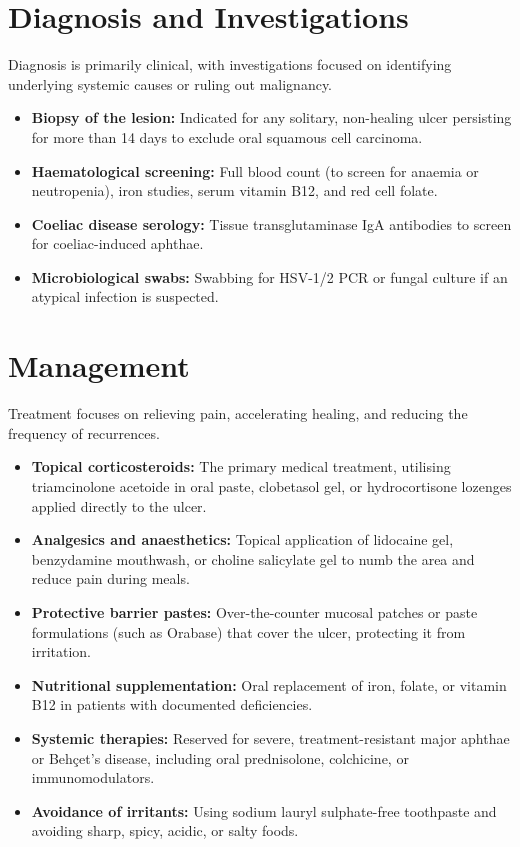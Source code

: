 \section*{Diagnosis and Investigations}
Diagnosis is primarily clinical, with investigations focused on identifying underlying systemic causes or ruling out malignancy.
\begin{itemize}
    \item \textbf{Biopsy of the lesion:} Indicated for any solitary, non-healing ulcer persisting for more than 14 days to exclude oral squamous cell carcinoma.
    \item \textbf{Haematological screening:} Full blood count (to screen for anaemia or neutropenia), iron studies, serum vitamin B12, and red cell folate.
    \item \textbf{Coeliac disease serology:} Tissue transglutaminase IgA antibodies to screen for coeliac-induced aphthae.
    \item \textbf{Microbiological swabs:} Swabbing for HSV-1/2 PCR or fungal culture if an atypical infection is suspected.
\end{itemize}

\section*{Management}
Treatment focuses on relieving pain, accelerating healing, and reducing the frequency of recurrences.
\begin{itemize}
    \item \textbf{Topical corticosteroids:} The primary medical treatment, utilising triamcinolone acetoide in oral paste, clobetasol gel, or hydrocortisone lozenges applied directly to the ulcer.
    \item \textbf{Analgesics and anaesthetics:} Topical application of lidocaine gel, benzydamine mouthwash, or choline salicylate gel to numb the area and reduce pain during meals.
    \item \textbf{Protective barrier pastes:} Over-the-counter mucosal patches or paste formulations (such as Orabase) that cover the ulcer, protecting it from irritation.
    \item \textbf{Nutritional supplementation:} Oral replacement of iron, folate, or vitamin B12 in patients with documented deficiencies.
    \item \textbf{Systemic therapies:} Reserved for severe, treatment-resistant major aphthae or Behçet's disease, including oral prednisolone, colchicine, or immunomodulators.
    \item \textbf{Avoidance of irritants:} Using sodium lauryl sulphate-free toothpaste and avoiding sharp, spicy, acidic, or salty foods.
\end{itemize}

